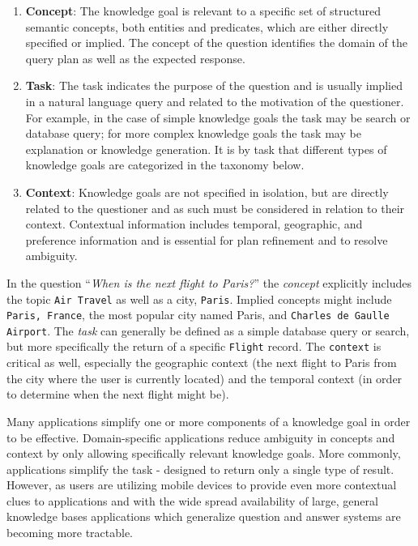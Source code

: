\documentclass[11pt,letterpaper]{article}
\begin{document}
\begin{enumerate}

\item \textbf{Concept}: The knowledge goal is relevant to a specific set of structured semantic concepts, both entities and predicates, which are either directly specified or implied. The concept of the question identifies the domain of the query plan as well as the expected response.

\item \textbf{Task}: The task indicates the purpose of the question and is usually implied in a natural language query and related to the motivation of the questioner. For example, in the case of simple knowledge goals the task may be search or database query; for more complex knowledge goals the task may be explanation or knowledge generation. It is by task that different types of knowledge goals are categorized in the taxonomy below.

\item \textbf{Context}: Knowledge goals are not specified in isolation, but are directly related to the questioner and as such must be considered in relation to their context. Contextual information includes temporal, geographic, and preference information and is essential for plan refinement and to resolve ambiguity.
\end{enumerate}

In the question ``\textit{When is the next flight to Paris?}'' the \textit{concept} explicitly includes the topic \texttt{Air Travel} as well as a city, \texttt{Paris}. Implied concepts might include \texttt{Paris, France}, the most popular city named Paris, and \texttt{Charles de Gaulle Airport}. The \textit{task} can generally be defined as a simple database query or search, but more specifically the return of a specific \texttt{Flight} record. The \texttt{context} is critical as well, especially the geographic context (the next flight to Paris from the city where the user is currently located) and the temporal context (in order to determine when the next flight might be).

Many applications simplify one or more components of a knowledge goal in order to be effective. Domain-specific applications reduce ambiguity in concepts and context by only allowing specifically relevant knowledge goals. More commonly, applications simplify the task - designed to return only a single type of result. However, as users are utilizing mobile devices to provide even more contextual clues to applications and with the wide spread availability of large, general knowledge bases applications which generalize question and answer systems are becoming more tractable.
\end{document}
